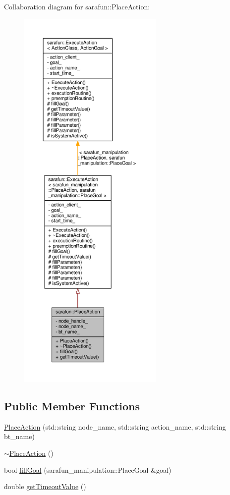 Collaboration diagram for sarafun\-:\-:Place\-Action\-:\nopagebreak
\begin{figure}[H]
\begin{center}
\leavevmode
\includegraphics[height=550pt]{d9/df5/classsarafun_1_1PlaceAction__coll__graph}
\end{center}
\end{figure}
\subsection*{Public Member Functions}
\begin{DoxyCompactItemize}
\item 
\hyperlink{classsarafun_1_1PlaceAction_ad55f21266cf4807d831e2834fb6e5259_ad55f21266cf4807d831e2834fb6e5259}{Place\-Action} (std\-::string node\-\_\-name, std\-::string action\-\_\-name, std\-::string bt\-\_\-name)
\item 
\hyperlink{classsarafun_1_1PlaceAction_ae98d86339fdd0d275acff03c968ff834_ae98d86339fdd0d275acff03c968ff834}{$\sim$\-Place\-Action} ()
\item 
bool \hyperlink{classsarafun_1_1PlaceAction_a7d48e758adf6cea93fa15409bafda8c8_a7d48e758adf6cea93fa15409bafda8c8}{fill\-Goal} (sarafun\-\_\-manipulation\-::\-Place\-Goal \&goal)
\item 
double \hyperlink{classsarafun_1_1PlaceAction_a0b53372fd2de920c3ebd94c8c7f80b6a_a0b53372fd2de920c3ebd94c8c7f80b6a}{get\-Timeout\-Value} ()
\end{DoxyCompactItemize}
